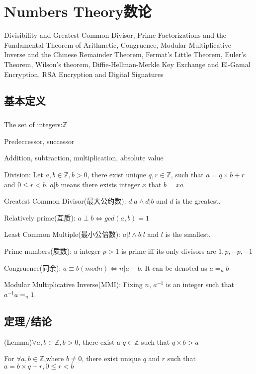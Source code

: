 \documentclass[12pt,a4paper]{ctexrep}
\begin{document}
\fi

\chapter{Numbers Theory数论}
Divisibility and Greatest Common Divisor, Prime Factorizations and the Fundamental Theorem of Arithmetic, Congruence, Modular Multiplicative Inverse and the Chinese Remainder Theorem, Fermat's Little Theorem, Euler's Theorem, Wilson's theorem, Diffie-Hellman-Merkle Key Exchange and El-Gamal Encryption, RSA Encryption and Digital Signatures
\section{基本定义}
\paragraph{}
The set of integers:$\mathbb{Z}$ 

Predeccessor, successor

Addition, subtraction, multiplication, absolute value

Division: Let $a,b \in \mathbb{Z}, b>0$, there exist unique $q,r \in \mathbb{Z}$, such that $a=q\times b+r$ and $0\leq r < b$. $a|b$ means there exists integer $x$ that $b = xa$

Greatest Common Divisor(最大公约数): $d|a \wedge d|b$ and $d$ is the greatest.

Relatively prime(互质): $a\perp b \Leftrightarrow gcd(a,b) = 1$

Least Common Multiple(最小公倍数): $a|l \wedge b|l$ and $l$ is the smallest.

Prime numbers(质数): a integer $p>1$ is prime iff its only divisors are $1,p,-p,-1$

Congruence(同余): $a\equiv b(mod n) \Leftrightarrow n|a-b$. It can be denoted as $a=_n b$

Modular Multiplicative Inverse(MMI): Fixing $n$, $a^{-1}$ is an integer such that $a^{-1}a =_n 1$.

\section{定理/结论}
(Lemma)$\forall a,b \in \mathbb{Z}, b>0$, there exist a $q \in \mathbb{Z}$ such that $q \times b >a$

For $\forall a,b \in \mathbb{Z}$,where $b \neq 0$, there exist unique $q$ and $r$ such that $a = b\times q+r, 0\leq r<b$
\end{document}
